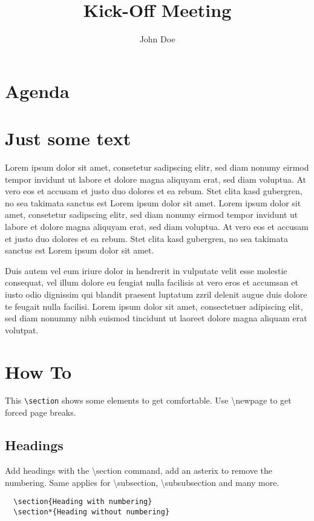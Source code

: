 \documentclass{minutes}
\title{Kick-Off Meeting}
\author{John Doe}
\begin{document}
\frontmatter

\section*{Agenda}

\section{Just some text}
Lorem ipsum dolor sit amet, consetetur sadipscing elitr, sed diam nonumy eirmod tempor invidunt ut labore et dolore magna aliquyam erat, sed diam voluptua. At vero eos et accusam et justo duo dolores et ea rebum. Stet clita kasd gubergren, no sea takimata sanctus est Lorem ipsum dolor sit amet. Lorem ipsum dolor sit amet, consetetur sadipscing elitr, sed diam nonumy eirmod tempor invidunt ut labore et dolore magna aliquyam erat, sed diam voluptua. At vero eos et accusam et justo duo dolores et ea rebum. Stet clita kasd gubergren, no sea takimata sanctus est Lorem ipsum dolor sit amet.   

Duis autem vel eum iriure dolor in hendrerit in vulputate velit esse molestie consequat, vel illum dolore eu feugiat nulla facilisis at vero eros et accumsan et iusto odio dignissim qui blandit praesent luptatum zzril delenit augue duis dolore te feugait nulla facilisi. Lorem ipsum dolor sit amet, consectetuer adipiscing elit, sed diam nonummy nibh euismod tincidunt ut laoreet dolore magna aliquam erat volutpat.

\newpage

\section{How To} \label{howTo}
This \texttt{\textbackslash section} shows some elements to get comfortable. Use \textbackslash newpage to get forced page breaks.

\subsection{Headings}
Add headings with the \textbackslash section command, add an asterix to remove the numbering. Same applies for \textbackslash subsection, \textbackslash subsubsection and many more.

\begin{verbatim}
  \section{Heading with numbering}
  \section*{Heading without numbering}
\end{verbatim}
\end{document}

